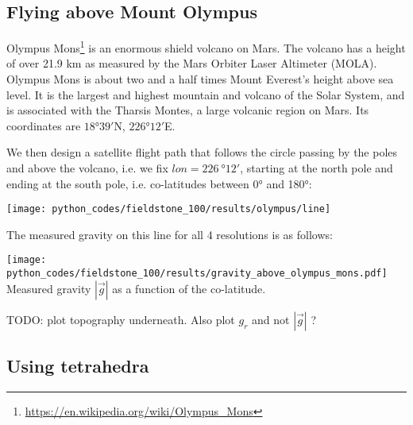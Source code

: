 \subsection*{Flying above Mount Olympus}

Olympus Mons\footnote{\url{https://en.wikipedia.org/wiki/Olympus_Mons}} 
is an enormous shield volcano on Mars. 
The volcano has a height of over 21.9 km as measured by the Mars Orbiter Laser Altimeter (MOLA).
Olympus Mons is about two and a half times Mount Everest's height above sea level. 
It is the largest and highest mountain and volcano of the Solar System,
and is associated with the Tharsis Montes, a large volcanic region on Mars.
Its coordinates are $18\si{\degree}39'$N, $226\si{\degree}12'$E. 

We then design a satellite flight path that follows the circle passing by the poles and above 
the volcano, i.e. we fix $lon=226~\si{\degree}12'$, starting at the north pole and ending 
at the south pole, i.e. co-latitudes between 0\si{\degree} and 180\si{\degree}:

\begin{center}
\texttt{[image: python\_codes/fieldstone\_100/results/olympus/line]}
\end{center}

The measured gravity on this line for all 4 resolutions is as follows:

\begin{center}
\texttt{[image: python\_codes/fieldstone\_100/results/gravity\_above\_olympus\_mons.pdf]}\\
{\captionfont Measured gravity $|\vec{g}|$ as a function of the co-latitude.}
\end{center}

TODO: plot topography underneath. Also plot $g_r$ and not $|\vec{g}|$ ?


\subsection*{Using tetrahedra}



\begin{center}
\end{center}

